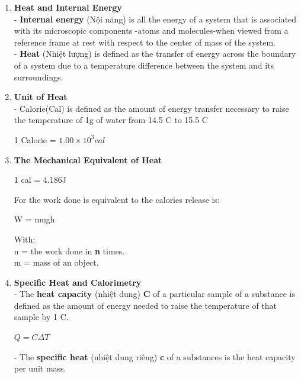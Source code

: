 \documentclass[10pt]{article}
\begin{document}
\begin{enumerate}
	\item \textbf{Heat and Internal Energy}\\
	- \textbf{Internal energy} (Nội năng) is all the energy of a system that is associated with its microscopic components -atoms and molecules-when viewed from a reference frame at rest with respect to the center of mass of the system.\\
	- \textbf{Heat} (Nhiệt lượng) is defined as the transfer of energy across the boundary of a system due to a temperature difference between the system and its surroundings.\\
	\item \textbf{Unit of Heat}\\
	- Calorie(Cal) is defined as the amount of energy transfer necessary to raise the temperature of 1g of water from 14.5 \degree C to 15.5 \degree C
	\begin{mybox}
	\begin{center}
	1 Calorie = $1.00 \times 10^3 cal$
	\end{center}
	\end{mybox}
	\item \textbf{The Mechanical Equivalent of Heat}
	\begin{mybox}
	\begin{center}
	1 cal = 4.186J
	\end{center}
	\end{mybox}
	For the work done is equivalent to the calories release is:
	\begin{mybox}
	\begin{center}
	W = nmgh
	\end{center}
	\end{mybox}
	With:\\
	n = the work done in \textbf{n} times.\\
	m = mass of an object.\\
	\item \textbf{Specific Heat and Calorimetry}\\
	- The \textbf{heat capacity} (nhiệt dung) \textbf{C} of a particular sample of a substance is defined as the amount of energy needed to raise the temperature of that sample by 1 \degree C.
	\begin{mybox}
	\begin{center}
	$Q = C \Delta T$
	\end{center}
	\end{mybox}
	- The \textbf{specific heat} (nhiệt dung riêng) \textbf{c} of a substances is the heat capacity per unit mass.

\end{enumerate}
\end{document}
